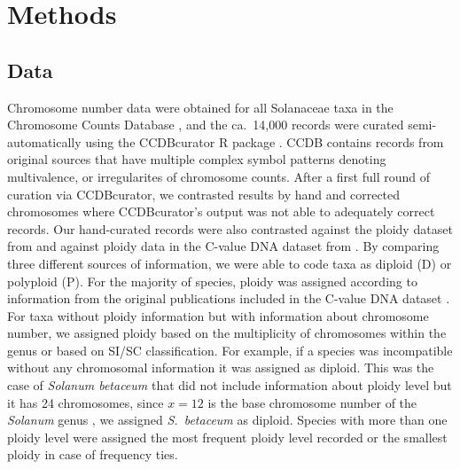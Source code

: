 \section{Methods}

\subsection{Data}


Chromosome number data were obtained for all Solanaceae taxa in the Chromosome Counts Database \citep[CCDB;][]{rice_2015}, and the ca.~14,000 records were curated semi-automatically using the CCDBcurator R package \citep{rivero_2019}. CCDB contains records from original sources that have multiple complex symbol patterns denoting multivalence, or irregularites of chromosome counts. After a first full round of curation via CCDBcurator, we contrasted results by hand and corrected chromosomes where CCDBcurator's output was not able to adequately correct records.  Our hand-curated records were also contrasted against the ploidy dataset from \citet{robertson_2011} and against ploidy data in the  C-value DNA dataset from \citet{bennett_2005}.
By comparing three different sources of information, we were able to code taxa as diploid (D) or polyploid (P).
For the majority of species, ploidy was assigned according to information from the original publications included in the  C-value DNA dataset \citep{bennett_2005}.
For taxa without ploidy information but with information about chromosome number, we assigned ploidy based on the multiplicity of chromosomes within the genus or based on SI/SC classification. For example, if a species was incompatible without any chromosomal information it was assigned as diploid.
This was the case of  \textit{Solanum betaceum} that did not include information about ploidy level but it has 24 chromosomes, since $x=12$ is the base chromosome number of the \textit{Solanum} genus \citep{olmstead_2007}, we assigned \textit{S.~betaceum} as diploid. 
Species with more than one ploidy level were assigned the most frequent ploidy level recorded or the smallest ploidy in case of frequency ties.
